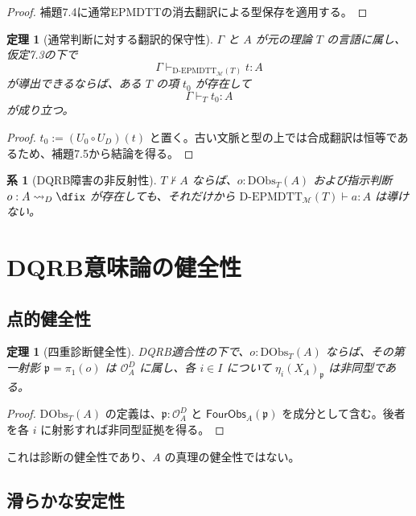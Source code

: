 \documentclass[a4paper,11pt]{ltjsarticle}
\theoremstyle{definition}
\theoremstyle{plain}
\newtheorem{theorem}[definition]{定理}
\newtheorem{corollary}[definition]{系}
\newcommand{\DEPMDTT}{\mathrm{D}\text{-}\mathrm{EPMDTT}}
\newcommand{\DObs}{\mathrm{DObs}}
\newcommand{\Meta}{\mathcal M}
\begin{document}
\begin{proof}
補題7.4に通常EPMDTTの消去翻訳による型保存を適用する。
\end{proof}

\begin{theorem}[通常判断に対する翻訳的保守性]
$\Gamma$ と $A$ が元の理論 $T$ の言語に属し、仮定7.3の下で
\begin{equation}
 \Gamma\vdash_{\DEPMDTT_{\Meta}(T)}t:A
\end{equation}
が導出できるならば、ある $T$ の項 $t_0$ が存在して
\begin{equation}
 \Gamma\vdash_Tt_0:A
\end{equation}
が成り立つ。
\end{theorem}

\begin{proof}
$t_0:=(U_0\circ U_D)(t)$ と置く。古い文脈と型の上では合成翻訳は恒等であるため、補題7.5から結論を得る。
\end{proof}

\begin{corollary}[DQRB障害の非反射性]
$T\nvdash A$ ならば、$o:\DObs_T(A)$ および指示判断 $o:A\rightsquigarrow_D\dfix$ が存在しても、それだけから $\DEPMDTT_{\Meta}(T)\vdash a:A$ は導けない。
\end{corollary}

\section{DQRB意味論の健全性}

\subsection{点的健全性}

\begin{theorem}[四重診断健全性]
DQRB適合性の下で、$o:\DObs_T(A)$ ならば、その第一射影 $\mathfrak p=\pi_1(o)$ は $\mathcal O_A^D$ に属し、各 $i\in I$ について $\eta_i(X_A)_{\mathfrak p}$ は非同型である。
\end{theorem}

\begin{proof}
$\DObs_T(A)$ の定義は、$\mathfrak p:\mathcal O_A^D$ と $\mathsf{FourObs}_A(\mathfrak p)$ を成分として含む。後者を各 $i$ に射影すれば非同型証拠を得る。
\end{proof}

これは診断の健全性であり、$A$ の真理の健全性ではない。

\subsection{滑らかな安定性}
\end{document}
